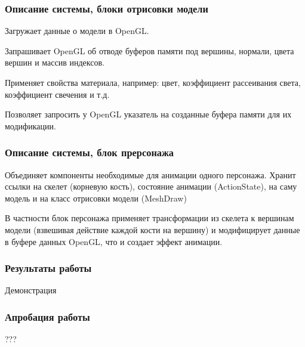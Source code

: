 \documentclass{beamer}
\begin{document}
\begin{frame}
\frametitle{Описание системы, блоки отрисовки модели}
	Загружает данные о модели в OpenGL.
	
    \smallskip
	Запрашивает OpenGL об отводе буферов памяти под вершины, нормали, цвета вершин и массив индексов.
    
    \smallskip
    Применяет свойства материала, например: цвет, коэффициент рассеивания света, коэффициент свечения и т.д.
    
    \smallskip
    Позволяет запросить у OpenGL указатель на созданные буфера памяти для их модификации.
\end{frame}


\begin{frame}
\frametitle{Описание системы, блок прерсонажа}
    Объединяет компоненты необходимые для анимации одного персонажа. Хранит ссылки на скелет (корневую кость), состояние анимации (ActionState), на саму модель и на класс отрисовки модели (MeshDraw)
    
    \medskip
    В частности блок персонажа применяет трансформации из скелета к вершинам модели (взвешивая действие каждой кости на вершину) и модифицирует данные в буфере данных OpenGL, что и создает эффект анимации.

\end{frame}




\begin{frame}
\frametitle{Результаты работы}
    \begin{center}            
    \begin{large}
    Демонстрация
    \end{large}
    \end{center}
\end{frame}



\begin{frame}
\frametitle{Апробация работы}
    \begin{center}            
    \begin{large}
    ???
    \end{large}
    \end{center}
\end{frame}
\end{document}
